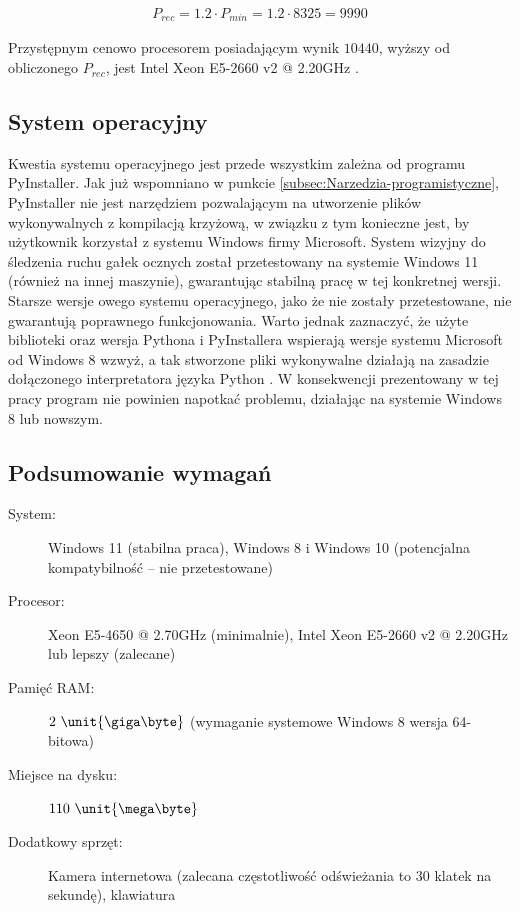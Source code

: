 \documentclass[a4paper,twoside,12pt]{book}
\begin{document}
\begin{align}
	P_{rec} = 1.2 \cdot P_{min} = 1.2 \cdot 8325 = 9990
	\label{eq:PassMark-rec}
\end{align}

Przystępnym cenowo procesorem posiadającym wynik $10440$, wyższy od obliczonego $P_{rec}$, jest Intel Xeon E5-2660 v2 @ 2.20GHz \cite{bib:ref-procesor-benchmark}. 

\subsection{System operacyjny}
\label{subsec:System-operacyjny}

Kwestia systemu operacyjnego jest przede wszystkim zależna od programu PyInstaller. Jak już wspomniano w punkcie \ref{subsec:Narzedzia-programistyczne}, PyInstaller nie jest narzędziem pozwalającym na utworzenie plików wykonywalnych z kompilacją krzyżową, w związku z tym konieczne jest, by użytkownik korzystał z systemu Windows firmy Microsoft. System wizyjny do śledzenia ruchu gałek ocznych został przetestowany na systemie Windows 11 (również na innej maszynie), gwarantując stabilną pracę w tej konkretnej wersji. Starsze wersje owego systemu operacyjnego, jako że nie zostały przetestowane, nie gwarantują poprawnego funkcjonowania. Warto jednak zaznaczyć, że użyte biblioteki oraz wersja Pythona i PyInstallera wspierają wersje systemu Microsoft od Windows 8 wzwyż, a tak stworzone pliki wykonywalne działają na zasadzie dołączonego interpretatora języka Python \cite{bib:PyInstaller-how-it-works}. W konsekwencji prezentowany w tej pracy program nie powinien napotkać problemu, działając na systemie Windows 8 lub nowszym.

\subsection{Podsumowanie wymagań}
\label{subsec:Podsumowanie-wymagan}

\begin{description}
	\item[System:] Windows 11 (stabilna praca), Windows 8 i Windows 10 (potencjalna kompatybilność -- nie przetestowane)
	\item[Procesor:] Xeon E5-4650 @ 2.70GHz (minimalnie), Intel Xeon E5-2660 v2 @ 2.20GHz lub lepszy (zalecane)
	\item[Pamięć RAM:] $2 \ \unit{\giga\byte}$ (wymaganie systemowe Windows 8 wersja 64-bitowa)
	\item[Miejsce na dysku:] $110 \ \unit{\mega\byte}$
	\item[Dodatkowy sprzęt:] Kamera internetowa (zalecana częstotliwość odświeżania to $30$ klatek na sekundę), klawiatura
\end{description}
\end{document}

